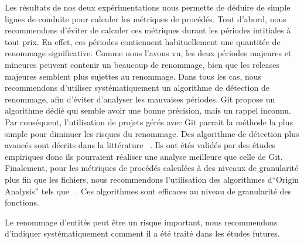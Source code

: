 Les résultats de nos deux expérimentations nous permette de déduire de simple lignes de conduite pour calculer les métriques de procédés. Tout d'abord, nous recommendons d'éviter de calculer ces métriques durant les périodes intitiales à tout prix. En effet, ces périodes contiennent habituellement une quantitée de renommage significative. Comme nous l'avons vu, les deux périodes majeures et mineures peuvent contenir un beaucoup de renommage, bien que les releases majeures semblent plus sujettes au renommage. Dans tous les cas, nous recommendons d'utiliser systématiquement un algorithme de détection de renommage, afin d'éviter d'analyser les mauvaises périodes. Git propose un algorithme dédié qui semble avoir une bonne précision, mais un rappel inconnu. Par conséquent, l'utilisation de projets gérés avec Git parrait la méthode la plus simple pour diminuer les risques du renommage. Des algorithme de détection plus avancés sont décrits dans la littérature ~\cite{antoniol_automatic_2004,lavoie_inferring_2012,steidl_incremental_2014}. Ils ont étés validés par des études empiriques donc ils pourraient réaliser une analyse meilleure que celle de Git. Finalement, pour les métriques de procédés calculées à des niveaux de granularité plus fin que les fichiers, nous recommendons l'utilisation des algorithmes d``Origin Analysis'' tels que ~\cite{wu_aura:_2010}. Ces algorithmes sont efficaces au niveau de granularité des fonctions.

Le renommage d'entités peut être un risque important, nous recommendons d'indiquer systématiquement comment il a été traité dans les études futures.\\       
